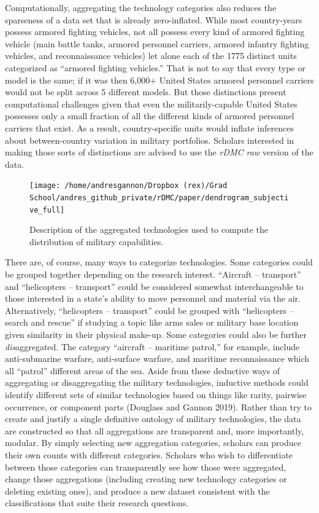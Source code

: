 \documentclass[
]{article}
\begin{document}
Computationally, aggregating the technology categories also reduces the sparseness of a data set that is already zero-inflated. While most country-years possess armored fighting vehicles, not all possess every kind of armored fighting vehicle (main battle tanks, armored personnel carriers, armored infantry fighting vehicles, and reconnaissance vehicles) let alone each of the 1775 distinct units categorized as ``armored fighting vehicles.'' That is not to say that every type or model is the same; if it was then 6,000+ United States armored personnel carriers would not be split across 5 different models. But those distinctions present computational challenges given that even the militarily-capable United States possesses only a small fraction of all the different kinds of armored personnel carriers that exist. As a result, country-specific units would inflate inferences about between-country variation in military portfolios. Scholars interested in making those sorts of distinctions are advised to use the \textit{rDMC raw} version of the data.

\begin{figure}[H]

{\centering \texttt{[image: /home/andresgannon/Dropbox (rex)/Grad School/andres\_github\_private/rDMC/paper/dendrogram\_subjective\_full]} 

}

\caption{Description of the aggregated technologies used to compute the distribution of military capabilities.}\label{fig:dendrogram}
\end{figure}

There are, of course, many ways to categorize technologies. Some categories could be grouped together depending on the research interest. ``Aircraft -- transport'' and ``helicopters -- transport'' could be considered somewhat interchangeable to those interested in a state's ability to move personnel and material via the air. Alternatively, ``helicopters -- transport'' could be grouped with ``helicopters -- search and rescue'' if studying a topic like arms sales or military base location given similarity in their physical make-up. Some categories could also be further \emph{dis}aggregated. The category ``aircraft -- maritime patrol,'' for example, include anti-submarine warfare, anti-surface warfare, and maritime reconnaissance which all ``patrol'' different areas of the sea. Aside from these deductive ways of aggregating or disaggregating the military technologies, inductive methods could identify different sets of similar technologies based on things like rarity, pairwise occurrence, or component parts (Douglass and Gannon 2019). Rather than try to create and justify a single definitive ontology of military technologies, the data are constructed so that all aggregations are transparent and, more importantly, modular. By simply selecting new aggregation categories, scholars can produce their own counts with different categories. Scholars who wish to differentiate between those categories can transparently see how those were aggregated, change those aggregations (including creating new technology categories or deleting existing ones), and produce a new dataset consistent with the classifications that suite their research questions.
\end{document}
